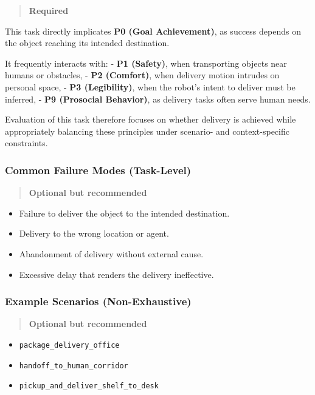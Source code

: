\documentclass[utf8]{frontiers_suppmat} %
\providecommand{\tightlist}{%
  \setlength{\itemsep}{0pt}\setlength{\parskip}{0pt}}
\begin{document}
\begin{quote}
\textbf{Required}
\end{quote}

This task directly implicates \textbf{P0 (Goal Achievement)}, as success
depends on the object reaching its intended destination.

It frequently interacts with: - \textbf{P1 (Safety)}, when transporting
objects near humans or obstacles, - \textbf{P2 (Comfort)}, when delivery
motion intrudes on personal space, - \textbf{P3 (Legibility)}, when the
robot's intent to deliver must be inferred, - \textbf{P9 (Prosocial
Behavior)}, as delivery tasks often serve human needs.

Evaluation of this task therefore focuses on whether delivery is
achieved while appropriately balancing these principles under scenario-
and context-specific constraints.

\subsubsection{Common Failure Modes
(Task-Level)}\label{common-failure-modes-task-level}

\begin{quote}
\textbf{Optional but recommended}
\end{quote}

\begin{itemize}
\tightlist
\item
  Failure to deliver the object to the intended destination.
\item
  Delivery to the wrong location or agent.
\item
  Abandonment of delivery without external cause.
\item
  Excessive delay that renders the delivery ineffective.
\end{itemize}

\subsubsection{Example Scenarios
(Non-Exhaustive)}\label{example-scenarios-non-exhaustive}

\begin{quote}
\textbf{Optional but recommended}
\end{quote}

\begin{itemize}
\tightlist
\item
  \texttt{package\_delivery\_office}
\item
  \texttt{handoff\_to\_human\_corridor}
\item
  \texttt{pickup\_and\_deliver\_shelf\_to\_desk}
\end{itemize}
\end{document}
